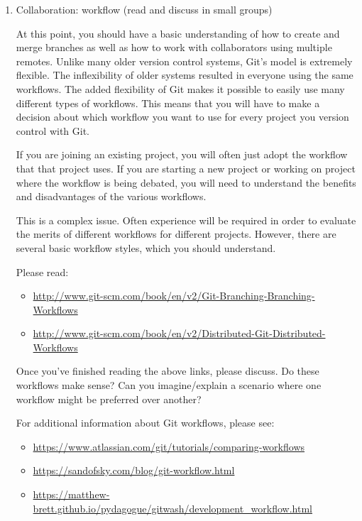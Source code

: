 \documentclass{article}
\begin{document}
\begin{enumerate}
\item Collaboration: workflow (read and discuss in small groups)

At this point, you should have a basic understanding of how to create and
merge branches as well as how to work with collaborators using multiple
remotes.  Unlike many older version control systems, Git's model is
extremely flexible.  The inflexibility of older systems resulted in
everyone using the same workflows.  The added flexibility of Git makes it
possible to easily use many different types of workflows.  This means that
you will have to make a decision about which workflow you want to use for
every project you version control with Git.

If you are joining an existing project, you will often just adopt the
workflow that that project uses.  If you are starting a new project or
working on project where the workflow is being debated, you will need to
understand the benefits and disadvantages of the various workflows.

This is a complex issue.  Often experience will be required in order to
evaluate the merits of different workflows for different projects.
However, there are several basic workflow styles, which you should
understand.

Please read:

\begin{itemize}
\item \url{http://www.git-scm.com/book/en/v2/Git-Branching-Branching-Workflows}
\item \url{http://www.git-scm.com/book/en/v2/Distributed-Git-Distributed-Workflows}
\end{itemize}

Once you've finished reading the above links, please discuss. Do these workflows
make sense? Can you imagine/explain a scenario where one workflow might be
preferred over another?

For additional information about Git workflows, please see:
\begin{itemize}
\item \url{https://www.atlassian.com/git/tutorials/comparing-workflows}
\item \url{https://sandofsky.com/blog/git-workflow.html}
\item \url{https://matthew-brett.github.io/pydagogue/gitwash/development_workflow.html}
\end{itemize}

\end{enumerate}
\end{document}
